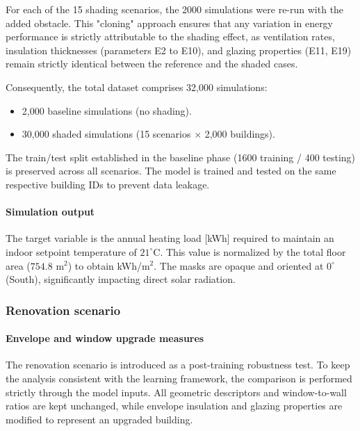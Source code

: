 \documentclass{article}
\begin{document}
For each of the 15 shading scenarios, the 2000 simulations were re-run with the added obstacle. This "cloning" approach ensures that any variation in energy performance is strictly attributable to the shading effect, as ventilation rates, insulation thicknesses (parameters E2 to E10), and glazing properties (E11, E19) remain strictly identical between the reference and the shaded cases.

Consequently, the total dataset comprises 32,000 simulations:
\begin{itemize}
    \item 2,000 baseline simulations (no shading).
    \item 30,000 shaded simulations (15 scenarios $\times$ 2,000 buildings).
\end{itemize}

The train/test split established in the baseline phase (1600 training / 400 testing) is preserved across all scenarios. The model is trained and tested on the same respective building IDs to prevent data leakage.

\paragraph{Simulation output}
The target variable is the annual heating load [kWh] required to maintain an indoor setpoint temperature of $21^\circ$C. This value is normalized by the total floor area ($754.8 \text{ m}^2$) to obtain kWh/m$^2$. The masks are opaque and oriented at $0^\circ$ (South), significantly impacting direct solar radiation.

\label{sec:mlp-no-shading}


\subsubsection{Renovation scenario}
\paragraph{Envelope and window upgrade measures}

The renovation scenario is introduced as a post-training robustness test. To
keep the analysis consistent with the learning framework, the comparison is
performed strictly through the model inputs. All geometric descriptors and
window-to-wall ratios are kept unchanged, while envelope insulation and glazing
properties are modified to represent an upgraded building.
\end{document}
